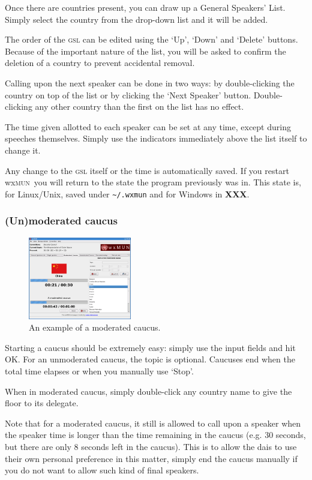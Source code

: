 \documentclass[11pt, a4paper]{article}
\newcommand\wxMUN{wx\textsc{mun}}
\begin{document}
Once there are countries present, you can draw up a General Speakers' List. Simply select the country from the drop-down list and it will be added. 

The order of the \textsc{gsl} can be edited using the `Up', `Down' and `Delete' buttons. Because of the important nature of the list, you will be asked to confirm the deletion of a country to prevent accidental removal.

Calling upon the next speaker can be done in two ways: by double-clicking the country on top of the list or by clicking the `Next Speaker' button. Double-clicking any other country than the first on the list has no effect.

The time given allotted to each speaker can be set at any time, except during speeches themselves. Simply use the indicators immediately above the list itself to change it.

Any change to the \textsc{gsl} itself or the time is automatically saved. If you restart \wxMUN\ you will return to the state the program previously was in. This state is, for Linux/Unix, saved under \texttt{\~{}/.wxmun} and for Windows in \textbf{XXX}.

\subsubsection{(Un)moderated caucus}
\begin{figure}
\includegraphics[width=0.40\textwidth]{screenshots/mod_caucus.png}
\caption{An example of a moderated caucus.}
\end{figure}

Starting a caucus should be extremely easy: simply use the input fields and hit OK. For an unmoderated caucus, the topic is optional. Caucuses end when the total time elapses or when you manually use `Stop'. 

When in moderated caucus, simply double-click any country name to give the floor to its delegate.

Note that for a moderated caucus, it still is allowed to call upon a speaker when the speaker time is longer than the time remaining in the caucus (e.g. 30 seconds, but there are only 8 seconds left in the caucus). This is to allow the dais to use their own personal preference in this matter, simply end the caucus manually if you do not want to allow such kind of final speakers.
\end{document}
